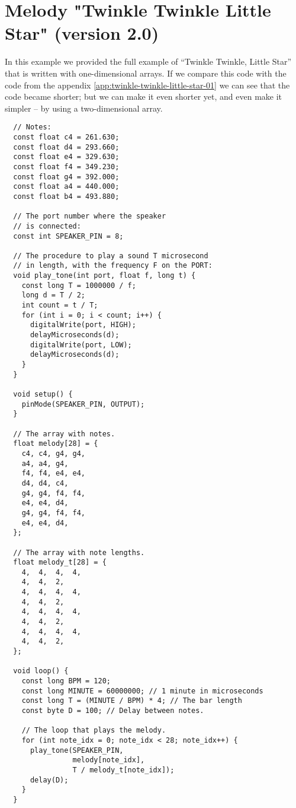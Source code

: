 \documentclass[../sparc.tex]{subfiles}
\begin{document}
\newpage
\chapter{Melody "Twinkle Twinkle Little Star" (version 2.0)}
\label{app:twinkle-twinkle-little-star-02}

In this example we provided the full example of ``Twinkle Twinkle, Little Star''
that is written with one-dimensional arrays.  If we compare this code with the
code from the appendix \ref{app:twinkle-twinkle-little-star-01} we can see that
the code became shorter; but we can make it even shorter yet, and even make it
simpler -- by using a two-dimensional array.

\begin{verbatim}
  // Notes:
  const float c4 = 261.630;
  const float d4 = 293.660;
  const float e4 = 329.630;
  const float f4 = 349.230;
  const float g4 = 392.000;
  const float a4 = 440.000;
  const float b4 = 493.880;

  // The port number where the speaker
  // is connected:
  const int SPEAKER_PIN = 8;

  // The procedure to play a sound T microsecond
  // in length, with the frequency F on the PORT:
  void play_tone(int port, float f, long t) {
    const long T = 1000000 / f;
    long d = T / 2;
    int count = t / T;
    for (int i = 0; i < count; i++) {
      digitalWrite(port, HIGH);
      delayMicroseconds(d);
      digitalWrite(port, LOW);
      delayMicroseconds(d);
    }
  }

  void setup() {
    pinMode(SPEAKER_PIN, OUTPUT);
  }

  // The array with notes.
  float melody[28] = {
    c4, c4, g4, g4,
    a4, a4, g4,
    f4, f4, e4, e4,
    d4, d4, c4,
    g4, g4, f4, f4,
    e4, e4, d4,
    g4, g4, f4, f4,
    e4, e4, d4,
  };

  // The array with note lengths.
  float melody_t[28] = {
    4,  4,  4,  4,
    4,  4,  2,
    4,  4,  4,  4,
    4,  4,  2,
    4,  4,  4,  4,
    4,  4,  2,
    4,  4,  4,  4,
    4,  4,  2,
  };

  void loop() {
    const long BPM = 120;
    const long MINUTE = 60000000; // 1 minute in microseconds
    const long T = (MINUTE / BPM) * 4; // The bar length
    const byte D = 100; // Delay between notes.

    // The loop that plays the melody.
    for (int note_idx = 0; note_idx < 28; note_idx++) {
      play_tone(SPEAKER_PIN,
                melody[note_idx],
                T / melody_t[note_idx]);
      delay(D);
    }
  }
\end{verbatim}
\end{document}
